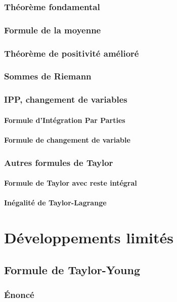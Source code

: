 \documentclass[12pt,a4paper,french]{book}
\begin{document}
		\subsection{Théorème fondamental}
		\subsection{Formule de la moyenne}
		\subsection{Théorème de positivité amélioré}
		\subsection{Sommes de Riemann}
		\subsection{IPP, changement de variables}
			\subsubsection{Formule d'Intégration Par Parties}
			\subsubsection{Formule de changement de variable}
		\subsection{Autres formules de Taylor}
			\subsubsection{Formule de Taylor avec reste intégral}
			\subsubsection{Inégalité de Taylor-Lagrange}

\chapter{Développements limités}
	\section{Formule de Taylor-Young}
		\subsection{Énoncé}
\end{document}
